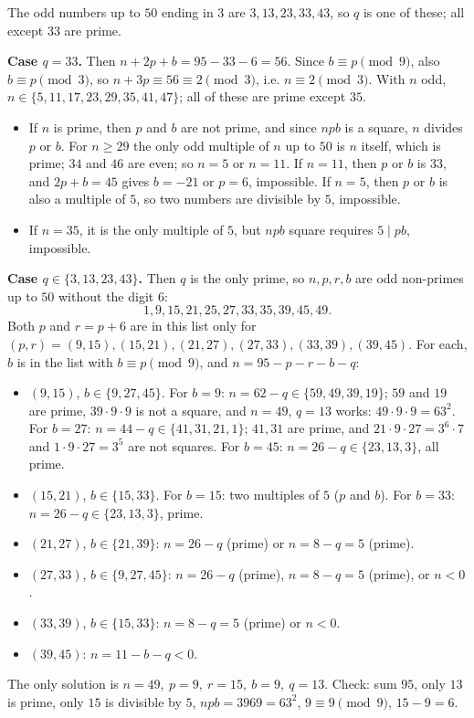 The odd numbers up to $50$ ending in $3$ are $3,13,23,33,43$, so $q$ is one of these; all except $33$ are prime.

\textbf{Case $q=33$.} Then $n+2p+b=95-33-6=56$. Since $b\equiv p\pmod 9$, also $b\equiv p\pmod3$, so $n+3p\equiv56\equiv2\pmod 3$, i.e. $n\equiv2\pmod3$. With $n$ odd, $n\in\{5,11,17,23,29,35,41,47\}$; all of these are prime except $35$.
\begin{itemize}
\item If $n$ is prime, then $p$ and $b$ are not prime, and since $npb$ is a square, $n$ divides $p$ or $b$. For $n\ge29$ the only odd multiple of $n$ up to $50$ is $n$ itself, which is prime; $34$ and $46$ are even; so $n=5$ or $n=11$. If $n=11$, then $p$ or $b$ is $33$, and $2p+b=45$ gives $b=-21$ or $p=6$, impossible. If $n=5$, then $p$ or $b$ is also a multiple of $5$, so two numbers are divisible by $5$, impossible.
\item If $n=35$, it is the only multiple of $5$, but $npb$ square requires $5\mid pb$, impossible.
\end{itemize}

\textbf{Case $q\in\{3,13,23,43\}$.} Then $q$ is the only prime, so $n,p,r,b$ are odd non-primes up to $50$ without the digit $6$:
\[1,9,15,21,25,27,33,35,39,45,49.\]
Both $p$ and $r=p+6$ are in this list only for $(p,r)=(9,15),(15,21),(21,27),(27,33),(33,39),(39,45)$. For each, $b$ is in the list with $b\equiv p\pmod 9$, and $n=95-p-r-b-q$:
\begin{itemize}
\item $(9,15)$, $b\in\{9,27,45\}$. For $b=9$: $n=62-q\in\{59,49,39,19\}$; $59$ and $19$ are prime, $39\cdot9\cdot9$ is not a square, and $n=49$, $q=13$ works: $49\cdot9\cdot9=63^2$. For $b=27$: $n=44-q\in\{41,31,21,1\}$; $41,31$ are prime, and $21\cdot9\cdot27=3^6\cdot7$ and $1\cdot9\cdot27=3^5$ are not squares. For $b=45$: $n=26-q\in\{23,13,3\}$, all prime.
\item $(15,21)$, $b\in\{15,33\}$. For $b=15$: two multiples of $5$ ($p$ and $b$). For $b=33$: $n=26-q\in\{23,13,3\}$, prime.
\item $(21,27)$, $b\in\{21,39\}$: $n=26-q$ (prime) or $n=8-q=5$ (prime).
\item $(27,33)$, $b\in\{9,27,45\}$: $n=26-q$ (prime), $n=8-q=5$ (prime), or $n<0$.
\item $(33,39)$, $b\in\{15,33\}$: $n=8-q=5$ (prime) or $n<0$.
\item $(39,45)$: $n=11-b-q<0$.
\end{itemize}
The only solution is $\boxed{n=49,\ p=9,\ r=15,\ b=9,\ q=13}$. Check: sum $95$, only $13$ is prime, only $15$ is divisible by $5$, $npb=3969=63^2$, $9\equiv9\pmod 9$, $15-9=6$.
